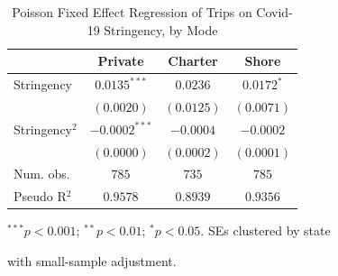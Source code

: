 \documentclass[12pt]{article}
\begin{document}
\begin{table}
\caption{Poisson Fixed Effect Regression of Trips on Covid-19 Stringency, by Mode}
\begin{center}
\begin{threeparttable}
\begin{tabular}{l c c c}
\toprule
 & Private & Charter & Shore \\
\midrule
Stringency     & $0.0135^{***}$  & $0.0236$   & $0.0172^{*}$ \\
               & $(0.0020)$      & $(0.0125)$ & $(0.0071)$   \\
Stringency$^2$ & $-0.0002^{***}$ & $-0.0004$  & $-0.0002$    \\
               & $(0.0000)$      & $(0.0002)$ & $(0.0001)$   \\
\midrule
Num. obs.      & $785$           & $735$      & $785$        \\
Pseudo R$^2$   & $0.9578$        & $0.8939$   & $0.9356$     \\
\bottomrule
\end{tabular}
\begin{tablenotes}[flushleft]
\scriptsize{
\item $^{***}p<0.001$; $^{**}p<0.01$; $^{*}p<0.05$. SEs clustered by state 
\item with small-sample adjustment.
}
\end{tablenotes}
\end{threeparttable}
\label{regResults}
\end{center}
\end{table}
\end{document}
